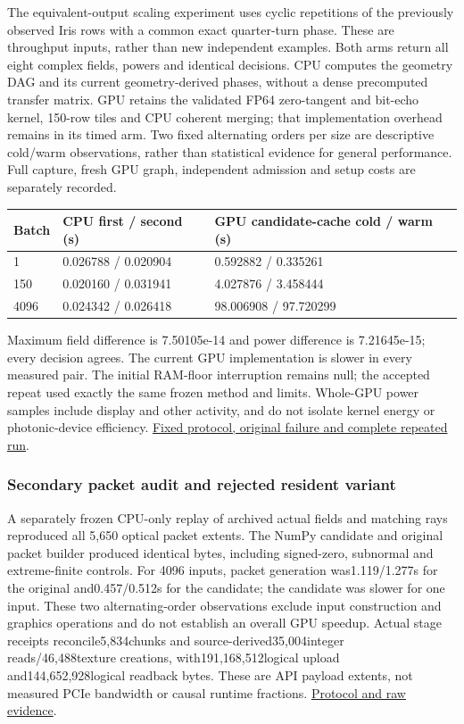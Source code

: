 \documentclass[
  10pt,
]{article}
\begin{document}
The equivalent-output scaling experiment uses cyclic repetitions of the
previously observed Iris rows with a common exact quarter-turn phase.
These are throughput inputs, rather than new independent examples. Both
arms return all eight complex fields, powers and identical decisions.
CPU computes the geometry DAG and its current geometry-derived phases,
without a dense precomputed transfer matrix. GPU retains the validated
FP64 zero-tangent and bit-echo kernel, 150-row tiles and CPU coherent
merging; that implementation overhead remains in its timed arm. Two
fixed alternating orders per size are descriptive cold/warm
observations, rather than statistical evidence for general performance.
Full capture, fresh GPU graph, independent admission and setup costs are
separately recorded.

\begin{longtable}[]{@{}lll@{}}
\toprule
Batch & CPU first / second (s) & GPU candidate-cache cold / warm (s) \\
\midrule
\endhead
1 & 0.026788 / 0.020904 & 0.592882 / 0.335261 \\
150 & 0.020160 / 0.031941 & 4.027876 / 3.458444 \\
4096 & 0.024342 / 0.026418 & 98.006908 / 97.720299 \\
\bottomrule
\end{longtable}

Maximum field difference is 7.50105e-14 and power difference is
7.21645e-15; every decision agrees. The current GPU implementation is
slower in every measured pair. The initial RAM-floor interruption
remains null; the accepted repeat used exactly the same frozen method
and limits. Whole-GPU power samples include display and other activity,
and do not isolate kernel energy or photonic-device efficiency.
\href{../NATIVE_GRAPHICS_SCALING_PROTOCOL_2026-10-09.md}{Fixed protocol,
original failure and complete repeated run}.

\hypertarget{secondary-packet-audit-and-rejected-resident-variant}{%
\subsubsection{Secondary packet audit and rejected resident
variant}\label{secondary-packet-audit-and-rejected-resident-variant}}

A separately frozen CPU-only replay of archived actual fields and
matching rays reproduced all 5,650 optical packet extents. The NumPy
candidate and original packet builder produced identical bytes,
including signed-zero, subnormal and extreme-finite controls. For 4096
inputs, packet generation was1.119/1.277s for the original
and0.457/0.512s for the candidate; the candidate was slower for one
input. These two alternating-order observations exclude input
construction and graphics operations and do not establish an overall GPU
speedup. Actual stage receipts reconcile5,834chunks and
source-derived35,004integer reads/46,488texture creations,
with191,168,512logical upload and144,652,928logical readback bytes.
These are API payload extents, not measured PCIe bandwidth or causal
runtime fractions.
\href{../NATIVE_PACKET_WORKLOAD_PROTOCOL_2026-10-09.md}{Protocol and raw
evidence}.
\end{document}
